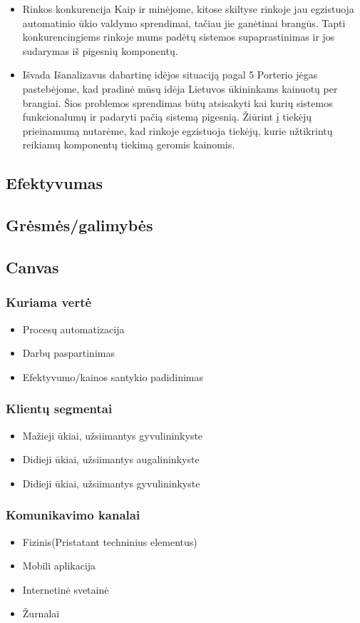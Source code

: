 \documentclass[oneside]{VUMIFPSkursinis}
\begin{document}
\begin{itemize}
		\item{Rinkos konkurencija}
Kaip ir minėjome, kitose skiltyse rinkoje jau egzistuoja automatinio ūkio valdymo sprendimai, tačiau jie ganėtinai brangūs. Tapti konkurencingiems rinkoje mums padėtų sistemos supaprastinimas ir jos sudarymas iš pigesnių komponentų.
		\item{Išvada} Išanalizavus dabartinę idėjos situaciją pagal 5 Porterio jėgas pastebėjome, kad pradinė mūsų idėja Lietuvos ūkininkams kainuotų per brangiai. Šios problemos sprendimas būtų atsisakyti kai kurių sistemos funkcionalumų ir padaryti pačią sistemą pigesnią. Žiūrint į tiekėjų prieinamumą nutarėme, kad  rinkoje egzistuoja tiekėjų, kurie užtikrintų reikiamų komponentų tiekimą geromis kainomis.

	\end{itemize}

	\subsection{Efektyvumas}
	\subsection{Grėsmės/galimybės}
	\subsection{Canvas}
	\subsubsection{Kuriama vertė}
	\begin{itemize}
		\item Procesų automatizacija
		\item Darbų paspartinimas
		\item Efektyvumo/kainos santykio padidinimas
	\end{itemize}
	\subsubsection{Klientų segmentai}
	\begin{itemize}
	\item Mažieji ūkiai, užsiimantys gyvulininkyste
	\item Didieji ūkiai, užsiimantys augalininkyste
	\item Didieji ūkiai, užsiimantys gyvulininkyste
	\end{itemize}
	\subsubsection{Komunikavimo kanalai}
	\begin{itemize}
	\item Fizinis(Pristatant techninius elementus)
	\item Mobili aplikacija
	\item Internetinė svetainė
	\item Žurnalai
	\end{itemize}
\end{document}
